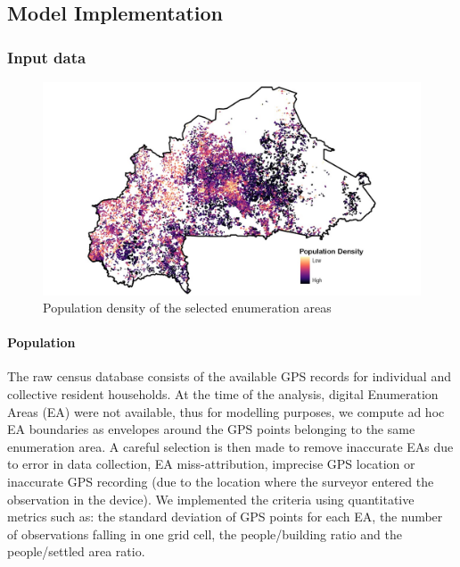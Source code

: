 \documentclass[]{book}
\let\oldparagraph\paragraph
\renewcommand{\paragraph}[1]{\oldparagraph{#1}\mbox{}}
\begin{document}
\subsection{Model Implementation}\label{model-implementation}

\subsubsection{Input data}\label{input-data-1}

\begin{figure}

{\centering \includegraphics[width=0.8\linewidth]{dat/BFAv1/map_EAs} 

}

\caption{Population density of the selected enumeration areas}\label{fig:map-gps}
\end{figure}

\paragraph{Population}\label{population}

The raw census database consists of the available GPS records for
individual and collective resident households. At the time of the
analysis, digital Enumeration Areas (EA) were not available, thus for
modelling purposes, we compute ad hoc EA boundaries as envelopes around
the GPS points belonging to the same enumeration area. A careful
selection is then made to remove inaccurate EAs due to error in data
collection, EA miss-attribution, imprecise GPS location or inaccurate
GPS recording (due to the location where the surveyor entered the
observation in the device). We implemented the criteria using
quantitative metrics such as: the standard deviation of GPS points for
each EA, the number of observations falling in one grid cell, the
people/building ratio and the people/settled area ratio.
\end{document}
